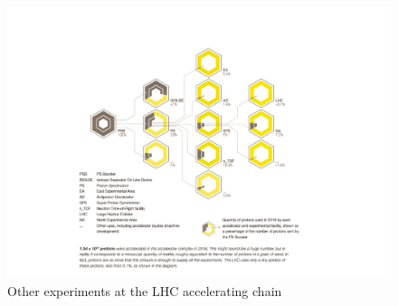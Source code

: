 \begin{figure}[!htbp]
	\centering
	\includegraphics[width=1.0\textwidth]{figures/LHC/distribution_of_protons_en.pdf}
	\caption{Other experiments at the LHC accelerating chain \cite{OtherExpAtLHCAcceleratingChain}}
	\label{fig:OtherExpAtAccStructure}
\end{figure}

